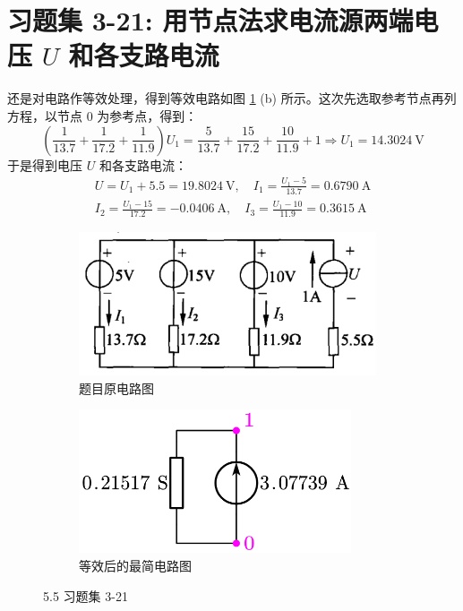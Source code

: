 \documentclass[UTF8]{report}
\theoremstyle{MyLineTheoremStyle} %
\theoremstyle{MyBlockTheoremStyle} %
\theoremstyle{MySubsubsectionStyle} %
\begin{document}
\section{习题集 3-21: 用节点法求电流源两端电压 $U$ 和各支路电流 }

还是对电路作等效处理，得到等效电路如图 \ref{5.5 习题集 3-21} (b) 所示。这次先选取参考节点再列方程，以节点 0 为参考点，得到：
\begin{equation}
\left(\frac{1}{13.7} + \frac{1}{17.2} + \frac{1}{11.9}\right) U_1 = \frac{5}{13.7} + \frac{15}{17.2} + \frac{10}{11.9} + 1\Longrightarrow U_1 = 14.3024 \ \mathrm{V}
\end{equation}
于是得到电压 $U$ 和各支路电流：
\begin{align}
U = U_1 + 5.5 = 19.8024 \ \mathrm{V} ,\quad  
I_1 = \frac{U_1 - 5}{13.7} =  0.6790 \ \mathrm{A}\\ 
I_2 = \frac{U_1 - 15}{17.2} = -0.0406 \ \mathrm{A}, \quad 
I_3 = \frac{U_1 - 10}{11.9} = 0.3615 \ \mathrm{A}
\end{align}


\begin{figure}[H]\centering
\begin{subfigure}[t]{0.5\columnwidth}\centering
    \includegraphics[height=120pt]{assets/5/5.5 (1).png}
    \caption{ 题目原电路图 }
\end{subfigure}\hfill
\begin{subfigure}[t]{0.5\columnwidth}\centering
    \includegraphics[height=120pt]{assets/5/5.5 (2).png}
    \caption{ 等效后的最简电路图 }
\end{subfigure}
\caption{ 5.5 习题集 3-21 }\label{5.5 习题集 3-21}
\end{figure}
\end{document}
